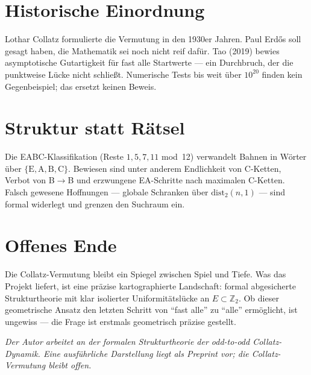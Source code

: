 \documentclass[11pt,a4paper]{article}
\newcommand{\Ztwo}{\mathbb{Z}_2}
\begin{document}
\section*{Historische Einordnung}

Lothar Collatz formulierte die Vermutung in den 1930er Jahren. Paul Erd\H{o}s
soll gesagt haben, die Mathematik sei noch nicht reif dafür. Tao (2019) bewies
asymptotische Gutartigkeit für fast alle Startwerte --- ein Durchbruch, der die
punktweise Lücke nicht schließt. Numerische Tests bis weit über $10^{20}$ finden
kein Gegenbeispiel; das ersetzt keinen Beweis.

\section*{Struktur statt Rätsel}

Die EABC-Klassifikation (Reste $1,5,7,11$ mod~12) verwandelt Bahnen in Wörter
über $\{\mathrm{E},\mathrm{A},\mathrm{B},\mathrm{C}\}$. Bewiesen sind unter anderem
Endlichkeit von C-Ketten, Verbot von B$\to$B und erzwungene EA-Schritte nach
maximalen C-Ketten. Falsch gewesene Hoffnungen --- globale Schranken über
$\mathrm{dist}_2(n,1)$ --- sind formal widerlegt und grenzen den Suchraum ein.

\section*{Offenes Ende}

Die Collatz-Vermutung bleibt ein Spiegel zwischen Spiel und Tiefe. Was das Projekt
liefert, ist eine präzise kartographierte Landschaft: formal abgesicherte
Strukturtheorie mit klar isolierter Uniformitätslücke an $E\subset\Ztwo$.
Ob dieser geometrische Ansatz den letzten Schritt von ``fast alle'' zu ``alle''
ermöglicht, ist ungewiss --- die Frage ist erstmals geometrisch präzise gestellt.

\vspace{0.8em}
\noindent\small\textit{Der Autor arbeitet an der formalen Strukturtheorie der
odd-to-odd Collatz-Dynamik. Eine ausführliche Darstellung liegt als Preprint vor;
die Collatz-Vermutung bleibt offen.}
\end{document}
